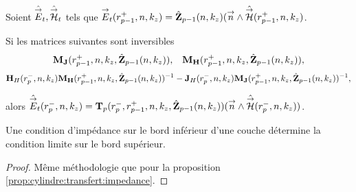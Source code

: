     \begin{prop}%
      \label{prop:cylindre:relevement:impedance}

      Soient \(\hat{{\overset{\rightarrow}{E}}}_t,\hat{{\overset{\rightarrow}{\mathcal{H}}}}_t\) tels que \({\overset{\rightarrow}{E}}_t(r_{p-1}^+,n,k_z) = \hat{\mathbf{Z}}_{p-1}(n,k_z)({\overset{\rightarrow}{n}} \wedge \hat{{\overset{\rightarrow}{\mathcal{H}}}}(r_{p-1}^+,n,k_z)\).

      Si les matrices suivantes sont inversibles
      \begin{align*}
        \mathbf{M}_{\mathbf{J}}(r_{p-1}^+,n,k_z,\hat{\mathbf{Z}}_{p-1}(n,k_z)), && \mathbf{M}_{\mathbf{H}}(r_{p-1}^+,n,k_z,\hat{\mathbf{Z}}_{p-1}(n,k_z)),
      \end{align*}
      \begin{align*}
        \mathbf{H}_{H}(r_{p}^-,n,k_z)\mathbf{M}_{\mathbf{H}}(r_{p-1}^+,n,k_z,\hat{\mathbf{Z}}_{p-1}(n,k_z))^{-1} - \mathbf{J}_{H}(r_{p}^-,n,k_z)\mathbf{M}_{\mathbf{J}}(r_{p-1}^+,n,k_z,\hat{\mathbf{Z}}_{p-1}(n,k_z))^{-1},
      \end{align*}

      alors \(\hat{{\overset{\rightarrow}{E}}}_t(r_{p}^-,n,k_z) = \mathbf{T}_p(r_p^-,r_{p-1}^+,n,k_z,\hat{\mathbf{Z}}_{p-1}(n,k_z))({\overset{\rightarrow}{n}} \wedge \hat{{\overset{\rightarrow}{\mathcal{H}}}}(r_{p}^-,n,k_z))\).

      Une condition d'impédance sur le bord inférieur d'une couche détermine la condition limite sur le bord supérieur.
    \end{prop}

    \begin{proof}
      Même méthodologie que pour la proposition \ref{prop:cylindre:transfert:impedance}.
    \end{proof}

